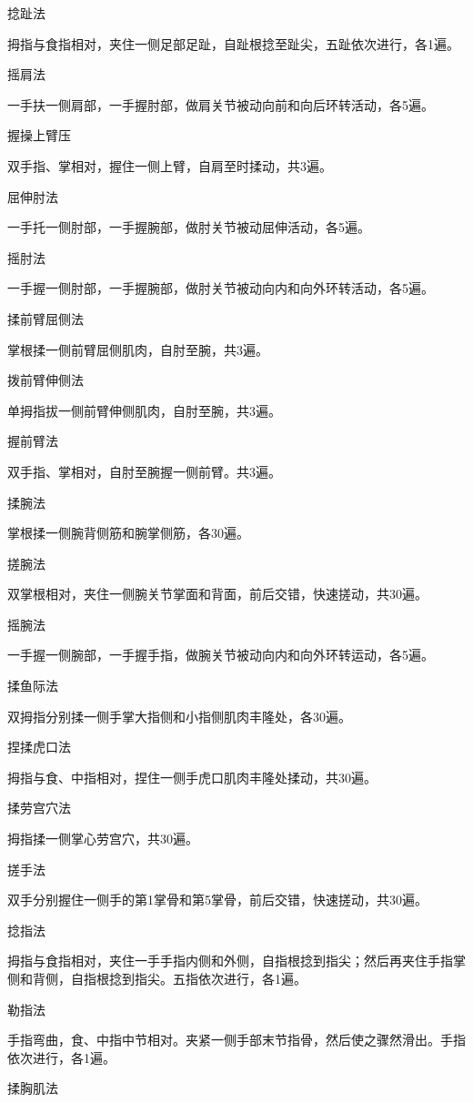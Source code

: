 \documentclass[12pt,UTF8,openany]{ctexbook}
\begin{document}
捻趾法

拇指与食指相对，夹住一侧足部足趾，自趾根捻至趾尖，五趾依次进行，各1遍。

摇肩法

一手扶一侧肩部，一手握肘部，做肩关节被动向前和向后环转活动，各5遍。

握操上臂压

双手指、掌相对，握住一侧上臂，自肩至时揉动，共3遍。

屈伸肘法

一手托一侧肘部，一手握腕部，做肘关节被动屈伸活动，各5遍。

摇肘法

一手握一侧肘部，一手握腕部，做肘关节被动向内和向外环转活动，各5遍。

揉前臂屈侧法

掌根揉一侧前臂屈侧肌肉，自肘至腕，共3遍。

拨前臂伸侧法

单拇指拔一侧前臂伸侧肌肉，自肘至腕，共3遍。

握前臂法

双手指、掌相对，自肘至腕握一侧前臂。共3遍。

揉腕法

掌根揉一侧腕背侧筋和腕掌侧筋，各30遍。

搓腕法

双掌根相对，夹住一侧腕关节掌面和背面，前后交错，快速搓动，共30遍。

摇腕法

一手握一侧腕部，一手握手指，做腕关节被动向内和向外环转运动，各5遍。

揉鱼际法

双拇指分别揉一侧手掌大指侧和小指侧肌肉丰隆处，各30遍。

捏揉虎口法

拇指与食、中指相对，捏住一侧手虎口肌肉丰隆处揉动，共30遍。

揉劳宫穴法

拇指揉一侧掌心劳宫穴，共30遍。

搓手法

双手分别握住一侧手的第1掌骨和第5掌骨，前后交错，快速搓动，共30遍。

捻指法

拇指与食指相对，夹住一手手指内侧和外侧，自指根捻到指尖；然后再夹住手指掌侧和背侧，自指根捻到指尖。五指依次进行，各1遍。

勒指法

手指弯曲，食、中指中节相对。夹紧一侧手部末节指骨，然后使之骤然滑出。手指依次进行，各1遍。

揉胸肌法
\end{document}
